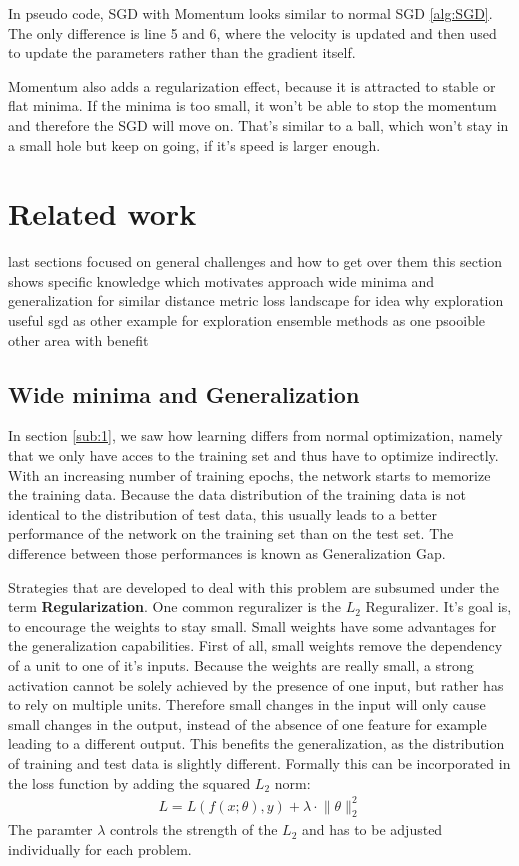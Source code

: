 In pseudo code, SGD with Momentum looks similar to normal SGD \ref{alg:SGD}. The
only difference is line 5 and 6, where the velocity is updated and then used to
update the parameters rather than the gradient itself.


Momentum also adds a regularization effect, because it is attracted to stable
or flat minima. If the minima is too small, it won't be able to stop the
momentum and therefore the SGD will move on. That's similar to a ball, which
won't stay in a small hole but keep on going, if it's speed is larger enough.






\section{Related work}

last sections focused on general challenges and how to get over them
this section shows specific knowledge which motivates approach
wide minima and generalization for similar distance metric
loss landscape for idea why exploration useful
sgd as other example for exploration
ensemble methods as one psooible other area with benefit



\subsection{Wide minima and Generalization}\label{sub:Generalization}
In section \ref{sub:1}, we saw how learning differs from normal optimization,
namely that we only have acces to the training set and thus have to optimize
indirectly. With an increasing number of training epochs, the network starts to
memorize the training data. Because the data distribution of the training data
is not identical to the distribution of test data, this usually leads to a
better performance of the network on the training set than on the test set. The
difference between those performances is known as Generalization Gap. 

Strategies that are developed to deal with this problem are subsumed under the
term \textbf{Regularization}. One common reguralizer is the $L_2$ Reguralizer.
It's goal is, to encourage the weights to stay small. Small weights have some
advantages for the generalization capabilities. First of all, small weights
remove the dependency of a unit to one of it's inputs. Because the weights are
really small, a strong activation cannot be solely achieved by the presence of
one input, but rather has to rely on multiple units. Therefore small changes in
the input will only cause small changes in the output, instead of the absence of
one feature for example leading to a different output. This benefits the
generalization, as the distribution of training and test data is slightly
different. Formally this can be incorporated in the loss function by adding the
squared $L_2$ norm:
\begin{align}
    L= L(f(x;\theta), y)+\lambda \cdot \lVert \theta \rVert_2^2
\end{align}
The paramter $\lambda$ controls the strength of the $L_2$ and has to be adjusted individually
for each problem.

